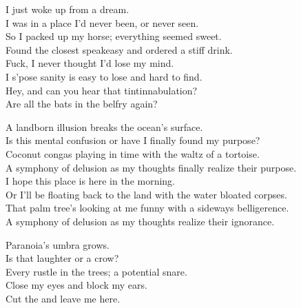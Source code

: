 
\label{album:phantom-island}




I just woke up from a dream. \\
I was in a place I'd never been, or never seen. \\
So I packed up my horse; everything seemed sweet. \\
Found the closest speakeasy and ordered a stiff drink. \\

Fuck, I never thought I'd lose my mind. \\
I s'pose sanity is easy to lose and hard to find. \\
Hey, and can you hear that tintinnabulation? \\
Are all the bats in the belfry again? \\


A landborn illusion breaks the ocean's surface. \\
Is this mental confusion or have I finally found my purpose? \\
Coconut congas playing in time with the waltz of a tortoise. \\
A symphony of delusion as my thoughts finally realize their purpose. \\
I hope this place is here in the morning. \\
Or I'll be floating back to the land with the water bloated corpses. \\
That palm tree's looking at me funny with a sideways belligerence. \\
A symphony of delusion as my thoughts realize their ignorance. \\


Paranoia's umbra grows. \\
Is that laughter or a crow? \\
Every rustle in the trees; a potential snare. \\
Close my eyes and block my ears. \\
Cut the  and leave me here. \\

